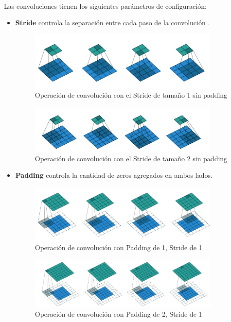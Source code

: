 Las convoluciones tienen los siguientes parámetros de configuración:
\begin{itemize}
    \item \textbf{\gls{Stride}} controla la separación entre cada paso de la convolución .
    \begin{figure}[H]
    \centering
    \includegraphics[width =0.9\textwidth]{images/convolucion/ima21.jpg}
    \caption{Operación de convolución con el \gls{Stride} de tamaño 1 sin padding}
    \label{fig:my_label}
\end{figure}
\begin{figure}[H]
    \centering
    \includegraphics[width =0.9\textwidth]{images/convolucion/ima25.jpg}
    \caption{Operación de convolución con el \gls{Stride} de tamaño 2 sin padding}
    \label{fig:my_label}
\end{figure}
    \item \textbf{Padding} controla la cantidad de zeros agregados en ambos lados.
    
\begin{figure}[H]
    \centering
    \includegraphics[width =0.9\textwidth]{images/convolucion/ima23.jpg}
    \caption{Operación de convolución con Padding de 1, \gls{Stride} de 1  }
    \label{fig:my_label}
\end{figure}
\begin{figure}[H]
    \centering
    \includegraphics[width =0.9\textwidth]{images/convolucion/ima24.jpg}
    \caption{Operación de convolución con Padding de 2, \gls{Stride} de 1  }
    \label{fig:convolucionNormal}
\end{figure}


\end{itemize}
